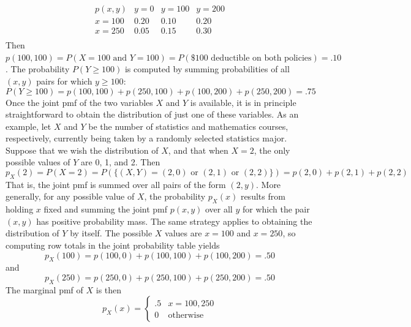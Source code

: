\documentclass{report}
\begin{document}
\begin{itemize}
            \[
                \begin{array}{c|ccc}
                    p(x, y) & y = 0 & y = 100 & y = 200 \\
                    \hline
                    x = 100 & 0.20 & 0.10 & 0.20 \\
                    x = 250 & 0.05 & 0.15 & 0.30 \\
                \end{array}
            \]
            Then \( p(100, 100) = P(X = 100 \text{ and } Y = 100) = P(\$100 \text{ deductible on both policies}) = .10 \). The probability \( P(Y \ge 100) \) is computed by summing probabilities of all \((x, y)\) pairs for which \( y \ge 100 \):
            \[
                P(Y \ge 100) = p(100, 100) + p(250, 100) + p(100, 200) + p(250, 200) = .75
            \]
            Once the joint pmf of the two variables \( X \) and \( Y \) is available, it is in principle straightforward to obtain the distribution of just one of these variables. As an example, let \( X \) and \( Y \) be the number of statistics and mathematics courses, respectively, currently being taken by a randomly selected statistics major. Suppose that we wish the distribution of \( X \), and that when \( X = 2 \), the only possible values of \( Y \) are 0, 1, and 2. Then
            \[
                p_X(2) = P(X = 2) = P(\{(X, Y) = (2, 0) \text{ or } (2, 1) \text{ or } (2, 2)\}) = p(2, 0) + p(2, 1) + p(2, 2)
            \]
            That is, the joint pmf is summed over all pairs of the form \((2, y)\). More generally, for any possible value of \( X \), the probability \( p_X(x) \) results from holding \( x \) fixed and summing the joint pmf \( p(x, y) \) over all \( y \) for which the pair \((x, y)\) has positive probability mass. The same strategy applies to obtaining the distribution of \( Y \) by itself.
            \bigbreak \noindent 
            The possible \( X \) values are \( x = 100 \) and \( x = 250 \), so computing row totals in the joint probability table yields
            \[
                p_X(100) = p(100, 0) + p(100, 100) + p(100, 200) = .50
            \]
            and
            \[
                p_X(250) = p(250, 0) + p(250, 100) + p(250, 200) = .50
            \]
            The marginal pmf of \( X \) is then
            \[
                p_X(x) = 
                \begin{cases}
                    .5 & x = 100, 250 \\
                    0 & \text{otherwise}
                \end{cases}
\]
\end{itemize}
\end{document}
